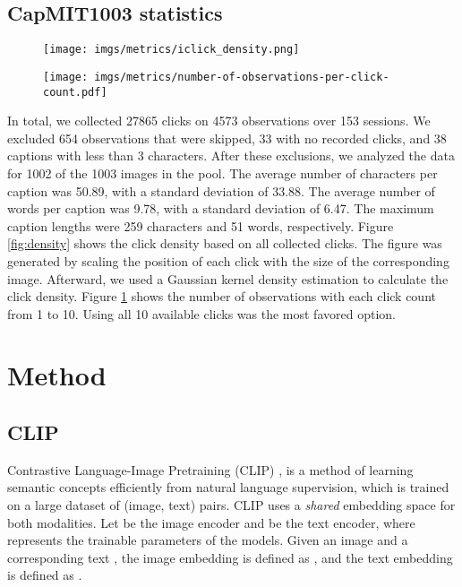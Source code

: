 \documentclass{article}
\begin{document}
\subsection{CapMIT1003 statistics}

\begin{figure}[!tbp]
  \centering
  \begin{minipage}[b]{0.43\textwidth}
    \texttt{[image: imgs/metrics/iclick\_density.png]}
    \label{fig:density}
  \end{minipage}
  \hfill
  \begin{minipage}[b]{0.49\textwidth}
    \texttt{[image: imgs/metrics/number-of-observations-per-click-count.pdf]}
    \label{fig:click_count}
  \end{minipage}
\end{figure}


In total, we collected 27865 clicks on 4573 observations over 153 sessions.
We excluded 654 observations that were skipped, 33 with no recorded clicks, and 38 captions with less than 3 characters. After these exclusions, we analyzed the data for 1002 of the 1003 images in the pool.
The average number of characters per caption was 50.89, with a standard deviation of 33.88. The average number of words per caption was 9.78, with a standard deviation of 6.47. The maximum caption lengths were 259 characters and 51 words, respectively. Figure \ref{fig:density} shows the click density based on all collected clicks. The figure was generated by scaling the position of each click with the size of the corresponding image. Afterward, we used a Gaussian kernel density estimation to calculate the click density. Figure \ref{fig:click_count} shows the number of observations with each click count from 1 to 10. Using all 10 available clicks was the most favored option. 

\section{Method}

\subsection{CLIP}
Contrastive Language-Image Pretraining (CLIP) \cite{radford2021learning}, is a method of learning semantic concepts efficiently from natural language supervision, which is trained on a large dataset of  (image, text) pairs. CLIP uses a \textit{shared} embedding space for both modalities. Let  be the image encoder and  be the text encoder, where  represents the trainable parameters of the models. Given an image  and a corresponding text , the image embedding is defined as , and the text embedding is defined as . 
\end{document}
